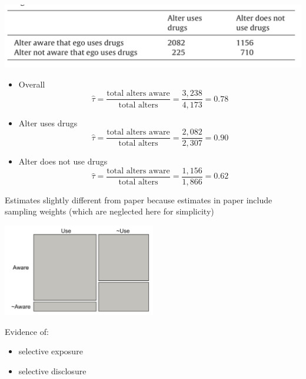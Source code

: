 \documentclass[aspectratio=169]{beamer}
\begin{document}
\begin{frame}

\begin{center}
\includegraphics[width=\textwidth]{figures/salganik_game_2011_tab2}
\end{center}

\begin{itemize}
\item Overall
\begin{equation*}
 \hat{\tau} = \frac{ \textrm{total alters aware} }  {\textrm{total alters}} = \frac{3,238}{4,173} = 0.78 
\end{equation*}
\pause
\item Alter uses drugs
\begin{equation*}
 \hat{\tau} = \frac{ \textrm{total alters aware} }  {\textrm{total alters}} = \frac{2,082}{2,307} = 0.90 
\end{equation*}
\pause
\item Alter does not use drugs
\begin{equation*}
 \hat{\tau} = \frac{ \textrm{total alters aware} }  {\textrm{total alters}} = \frac{1,156}{1,866} = 0.62 
\end{equation*}
\end{itemize}

\vfill
{\tiny Estimates slightly different from paper because estimates in paper include sampling weights (which are neglected here for simplicity)}

\end{frame}
\begin{frame}

\begin{center}
\includegraphics[width=0.5\textwidth]{figures/salganik_game_2011_fig3}
\end{center}

\vfill
Evidence of:
\begin{itemize}
\item selective exposure \pause
\item selective disclosure
\end{itemize}

\end{frame}
\end{document}
